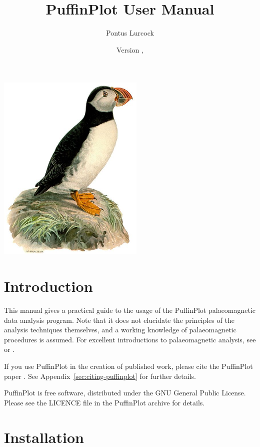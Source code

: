 \documentclass[a4paper,british]{article}
\title{PuffinPlot User Manual}
\author{Pontus Lurcock}
\date{Version \HgVersion, \HgDate}
\newcommand{\ppcmd}[1]{\textsf{#1}} %
\begin{document}
\maketitle
\begin{center}
\includegraphics[width=70mm]{figures/Fratercula_arctica.jpeg}
\end{center}

\tableofcontents

\section{Introduction}

This manual gives a practical guide to the usage of the PuffinPlot
palaeomagnetic data analysis program. Note that it does not elucidate the
principles of the analysis techniques themselves, and a working knowledge of
palaeomagnetic procedures is assumed. For excellent introductions to
palaeomagnetic analysis, see \cite{tauxe2010paleomagnetism} or
\cite{butler1992paleomagnetism}.

If you use PuffinPlot in the creation of published work, please cite the
PuffinPlot paper \citep{lurcock2012puffinplot}. See
Appendix~\ref{sec:citing-puffinplot} for further details.

PuffinPlot is free software, distributed under the GNU General Public
License. Please see the \ppcmd{LICENCE} file in the PuffinPlot archive
for details.

\section{Installation}
\end{document}
